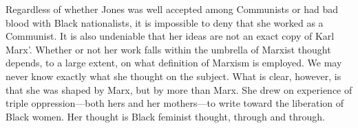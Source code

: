 \documentclass[man,12pt,natbib]{apa6}
\begin{document}
Regardless of whether Jones was well accepted among Communists or had bad blood
with Black nationalists, it is impossible to deny that she worked as a
Communist.  It is also undeniable that her ideas are not an exact copy of Karl
Marx'. Whether or not her work falls within the umbrella of Marxist thought 
depends, to a large extent, on what definition of Marxism is employed.
We may never know exactly what she thought on the subject.  What is clear,
however, is that she was shaped by Marx, but by more than Marx. She drew on
experience of triple oppression---both hers and her mothers---to write toward
the liberation of Black women. Her thought is Black feminist thought, through
and through.

\nocite{Azikiwe13}
\nocite{Davies08}
\nocite{Davies11}
\nocite{Davis15}
\nocite{Haan13}
\nocite{Hinds08}
\nocite{Howard13}
\nocite{Johnson08}
\nocite{Johnson84}
\nocite{Jones49a}
\nocite{Jones49b}
\nocite{Keith13}
\nocite{Lalkar}
\nocite{Lynn14}
\nocite{Mahamdallie04}
\nocite{McClendon96}
\nocite{McDuffie11}
\nocite{McKittrick08}
\nocite{OBrien14}
\nocite{Olende14}
\nocite{Shabazz09}
\nocite{Sherwood00}
\nocite{Taylor08}
\nocite{Thomson09}
\nocite{Washington03}
\nocite{Weigand01}

\clearpage

\end{document}
